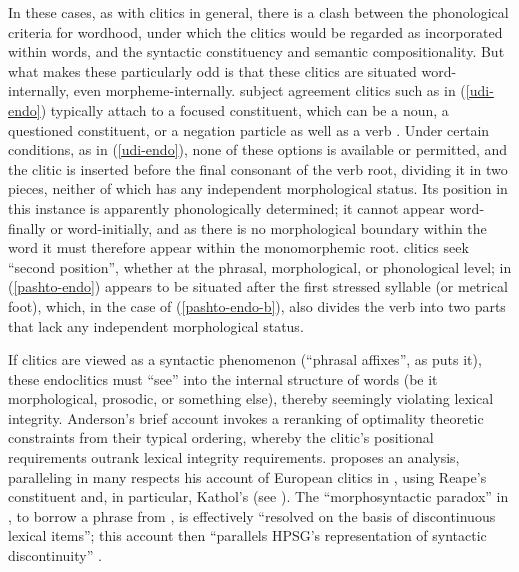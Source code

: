 \documentclass[output=paper
 	        ,biblatex
                ,babelshorthands
                ,newtxmath
                ,draftmode
                ,colorlinks, citecolor=brown
]{langscibook}
\begin{document}
In these cases, as with clitics in general, there is a clash between the phonological criteria for wordhood, under which the clitics would be regarded as incorporated within words, and the syntactic constituency and semantic compositionality.
But what makes these particularly odd is that these clitics are situated word-internally, even morpheme-internally.
 subject agreement clitics such as  in (\ref{udi-endo}) typically attach to a focused constituent, which can be a noun, a questioned constituent, or a negation particle as well as a verb \citep{Harris2000}.
Under certain conditions, as in (\ref{udi-endo}), none of these options is available or permitted, and the clitic is inserted before the final consonant of the verb root, dividing it in two pieces, neither of which has any independent morphological status.
Its position in this instance is apparently phonologically determined; it cannot appear word-finally or word-initially, and as there is no morphological boundary within the word it must therefore appear within the monomorphemic root.
 clitics seek ``second position'', whether at the phrasal, morphological, or phonological level;  in (\ref{pashto-endo}) appears to be situated after the first stressed syllable (or metrical foot), which, in the case of (\ref{pashto-endo-b}), also divides the verb into two parts that lack any independent morphological status.

If clitics are viewed as a syntactic phenomenon (``phrasal affixes'', as \citealt{Anderson2005} puts
it), these endoclitics must ``see'' into the internal structure of words (be it morphological,
prosodic, or something else), thereby seemingly violating lexical
integrity. Anderson's brief account invokes a reranking of optimality theoretic constraints from
their typical ordering, whereby the clitic's positional requirements outrank lexical integrity
requirements. \citet{Crysmann2000b} proposes an analysis, paralleling in many respects his account
of European  clitics in \citet{Crysmann2000a}, using Reape's constituent  \citep{Reape1994} and, in particular, Kathol's 
\citep{Kathol2000a} (see ). The ``morphosyntactic paradox'' in , to borrow
a phrase from \citet[]{Crysmann2003d}, is effectively ``resolved on the basis of discontinuous lexical items''; this account then ``parallels HPSG's representation of syntactic discontinuity'' \citep{Crysmann2000b}.
\end{document}
